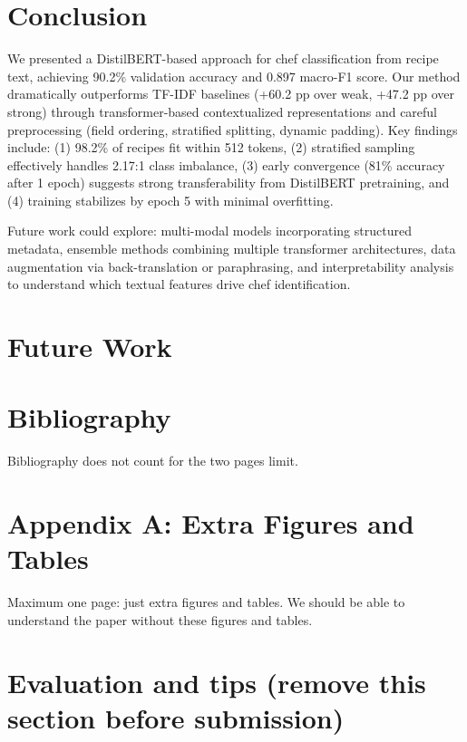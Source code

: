 \documentclass[twocolumn,10pt]{article}
\begin{document}
\section{Conclusion}

We presented a DistilBERT-based approach for chef classification from recipe text, achieving 90.2\% validation accuracy and 0.897 macro-F1 score. Our method dramatically outperforms TF-IDF baselines (+60.2 pp over weak, +47.2 pp over strong) through transformer-based contextualized representations and careful preprocessing (field ordering, stratified splitting, dynamic padding). Key findings include: (1) 98.2\% of recipes fit within 512 tokens, (2) stratified sampling effectively handles 2.17:1 class imbalance, (3) early convergence (81\% accuracy after 1 epoch) suggests strong transferability from DistilBERT pretraining, and (4) training stabilizes by epoch 5 with minimal overfitting.

Future work could explore: multi-modal models incorporating structured metadata, ensemble methods combining multiple transformer architectures, data augmentation via back-translation or paraphrasing, and interpretability analysis to understand which textual features drive chef identification.

\section{Future Work}

\section*{Bibliography}



Bibliography does not count for the two pages limit.


\appendix

\section*{Appendix A: Extra Figures and Tables}

Maximum one page: just extra figures and tables. We should be able to understand the paper without these figures and tables.

\section{Evaluation and tips (remove this section before submission)}
\end{document}
